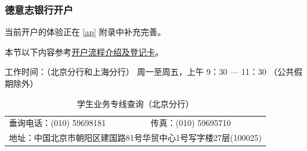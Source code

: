 \documentclass{article}
\begin{document}
\subsubsection[德意志银行开户]{德意志银行开户}
当前开户的体验正在 \ref{ap} 附录中补充完善。

本节以下内容参考\href{https://china.db.com/china/docs/Deutsche_Bank-China-Account-Opening-Process-And-Introduction.pdf}{开户流程介绍及登记卡}。

工作时间：（北京分行和上海分行） 周一至周五，上午 9：30 --- 11：30 （公共假期除外）

\begin{table}[htbp]
\caption{学生业务专线查询（北京分行）}
\label{tb:bank-communication}
\centering
\begin{tabular}{ll}
  垂询电话：(010) 59698181 & 传真：(010) 59695710 \\
  \multicolumn{2}{l}{地址：中国北京市朝阳区建国路81号华贸中心1号写字楼27层(100025)}
\end{tabular}  
\end{table}
\end{document}
